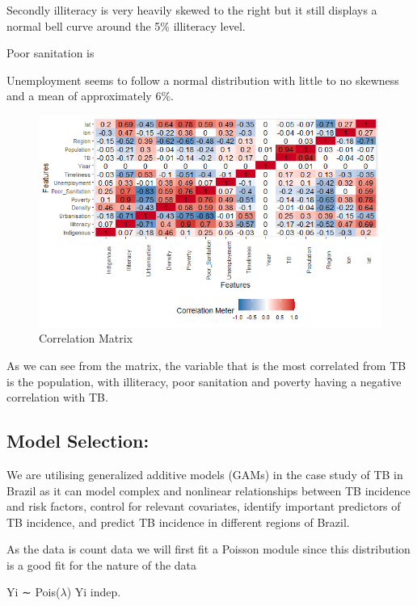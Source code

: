 \documentclass[
  letterpaper,
  DIV=11,
  numbers=noendperiod]{scrartcl}
\begin{document}
Secondly illiteracy is very heavily skewed to the right but it still
displays a normal bell curve around the 5\% illiteracy level.

Poor sanitation is

Unemployment seems to follow a normal distribution with little to no
skewness and a mean of approximately 6\%.

\begin{figure}

{\centering \includegraphics{HeatMap.png}

}

\caption{Correlation Matrix}

\end{figure}

As we can see from the matrix, the variable that is the most correlated
from TB is the population, with illiteracy, poor sanitation and poverty
having a negative correlation with TB.

\hypertarget{model-selection}{%
\subsection{Model Selection:}\label{model-selection}}

We are utilising generalized additive models (GAMs) in the case study of
TB in Brazil as it can model complex and nonlinear relationships between
TB incidence and risk factors, control for relevant covariates, identify
important predictors of TB incidence, and predict TB incidence in
different regions of Brazil.

As the data is count data we will first fit a Poisson module since this
distribution is a good fit for the nature of the data

Yi ∼ Pois(\(\lambda\)) Yi indep.
\end{document}

